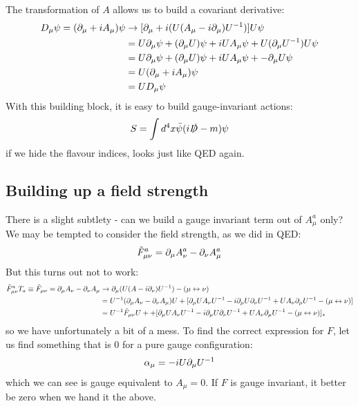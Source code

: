 The transformation of $A$ allows us to build a covariant derivative:
\begin{equation}
    \begin{split}
        D_\mu \psi = (\partial_\mu + iA_\mu)\psi &\to [\partial_\mu + i(U(A_\mu - i\partial_\mu)U^{-1})]U\psi
        \\ &= U\partial_\mu \psi + (\partial_\mu U)\psi + i UA_\mu \psi + U(\partial_\mu U^{-1})U\psi 
        \\ &= U\partial_\mu \psi + (\partial_\mu U)\psi + i UA_\mu \psi + -\partial_\mu U \psi
        \\ &= U(\partial_\mu + iA_\mu)\psi 
        \\ &= UD_\mu \psi
    \end{split}
\end{equation}
With this building block, it is easy to build gauge-invariant actions:
\begin{equation}
    S = \int d^4x \bar{\psi}(i\slashed{D} - m)\psi
\end{equation}
if we hide the flavour indices, looks just like QED again.

\subsection{Building up a field strength}
There is a slight subtlety - can we build a gauge invariant term out of $A^a_\mu$ only? We may be tempted to consider the field strength, as we did in QED:
\begin{equation}
    \tilde{F}^a_{\mu\nu} = \partial_\mu A^a_\nu - \partial_\nu A^a_\mu
\end{equation}
But this turns out not to work:
\begin{equation}
    \begin{split}
        \tilde{F}^a_{\mu\nu}T_a \equiv \tilde{F}_{\mu\nu} = \partial_\mu A_\nu - \partial_\nu A_\mu &\to \partial_\mu (U(A - i\partial_\nu)U^{-1}) - (\mu \leftrightarrow \nu)
        \\ &= U^{-1}(\partial_\mu A_\nu - \partial_\nu A_\mu)U + [\partial_\mu U A_\nu U^{-1} - i\partial_\mu U \partial_\nu U^{-1} + UA_\nu \partial_\mu U^{-1} - (\mu \leftrightarrow \nu)]
        \\ &= U^{-1}\tilde{F}_{\mu\nu}U + + [\partial_\mu U A_\nu U^{-1} - i\partial_\mu U \partial_\nu U^{-1} + UA_\nu \partial_\mu U^{-1} - (\mu \leftrightarrow \nu)]_*
    \end{split}
\end{equation}
so we have unfortunately a bit of a mess. To find the correct expression for $F$, let us find something that is 0 for a pure gauge configuration:
\begin{equation}
    \alpha_\mu = -iU\partial_\mu U^{-1}
\end{equation}
which we can see is gauge equivalent to $A_\mu = 0$. If $F$ is gauge invariant, it better be zero when we hand it the above.

